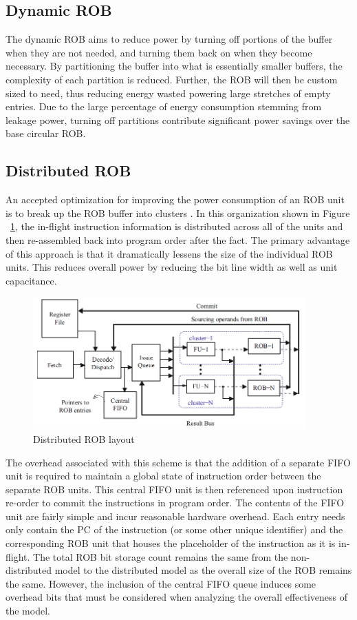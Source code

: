 \subsection{Dynamic ROB}
The dynamic ROB aims to reduce power by turning off portions of the buffer when they
are not needed, and turning them back on when they become necessary. By partitioning
the buffer into what is essentially smaller buffers, the complexity of each partition
is reduced. Further, the ROB will then be custom sized to need, thus reducing energy
wasted powering large stretches of empty entries. Due to the large percentage of energy
consumption stemming from leakage power, turning off partitions contribute significant
power savings over the base circular ROB.

\subsection{Distributed ROB}
An accepted optimization for improving the power consumption of an ROB unit 
is to break up the ROB buffer into clusters \cite{rabaey}.  In this organization shown in Figure ~\ref{fig:distrob}, 
the in-flight 
instruction information is distributed across all of the units and then re-assembled 
back into program order after the fact.  The primary advantage of this approach 
is that it dramatically lessens the size of the individual ROB units.  This reduces overall
power by reducing the bit line width as well as unit capacitance.

\begin{figure}
\centering
\includegraphics[height=2in]{clusterROB.png}
\caption{Distributed ROB layout}
\label{fig:distrob}
\end{figure}


The overhead associated with this scheme is that the addition of a separate FIFO unit
is required to maintain a global state of instruction order between the separate ROB units.
This central FIFO unit is then referenced upon instruction re-order to commit the instructions
in program order.  The contents of the FIFO unit are fairly simple and incur reasonable hardware
overhead.  Each entry needs only contain the PC of the instruction (or some other unique identifier)
and the corresponding ROB unit that houses the placeholder of the instruction as it is in-flight. 
The total ROB bit storage count remains the same from the non-distributed model to the distributed model
as the overall size of the ROB remains the same.  However, the inclusion of the central FIFO queue 
induces some overhead bits that must be considered when analyzing the overall effectiveness of the 
model.  

